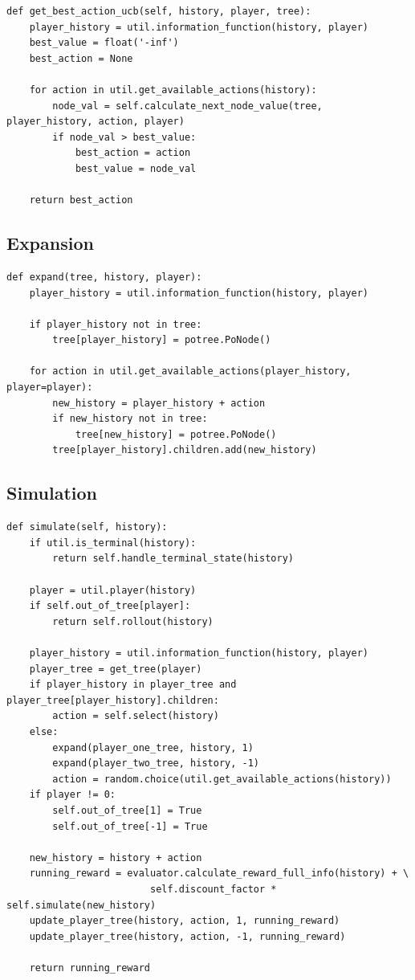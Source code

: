 \begin{lstlisting}[style=Python]
def get_best_action_ucb(self, history, player, tree):
    player_history = util.information_function(history, player)
    best_value = float('-inf')
    best_action = None

    for action in util.get_available_actions(history):
        node_val = self.calculate_next_node_value(tree, player_history, action, player)
        if node_val > best_value:
            best_action = action
            best_value = node_val

    return best_action
\end{lstlisting}


\subsection{Expansion}\label{subsec:expansion}

\begin{lstlisting}[style=Python]
def expand(tree, history, player):
    player_history = util.information_function(history, player)

    if player_history not in tree:
        tree[player_history] = potree.PoNode()

    for action in util.get_available_actions(player_history, player=player):
        new_history = player_history + action
        if new_history not in tree:
            tree[new_history] = potree.PoNode()
        tree[player_history].children.add(new_history)
\end{lstlisting}

\subsection{Simulation}\label{subsec:simulation}


\begin{lstlisting}[style=Python]
def simulate(self, history):
    if util.is_terminal(history):
        return self.handle_terminal_state(history)

    player = util.player(history)
    if self.out_of_tree[player]:
        return self.rollout(history)

    player_history = util.information_function(history, player)
    player_tree = get_tree(player)
    if player_history in player_tree and player_tree[player_history].children:
        action = self.select(history)
    else:
        expand(player_one_tree, history, 1)
        expand(player_two_tree, history, -1)
        action = random.choice(util.get_available_actions(history))
    if player != 0:
        self.out_of_tree[1] = True
        self.out_of_tree[-1] = True

    new_history = history + action
    running_reward = evaluator.calculate_reward_full_info(history) + \
                         self.discount_factor * self.simulate(new_history)
    update_player_tree(history, action, 1, running_reward)
    update_player_tree(history, action, -1, running_reward)

    return running_reward
\end{lstlisting}



